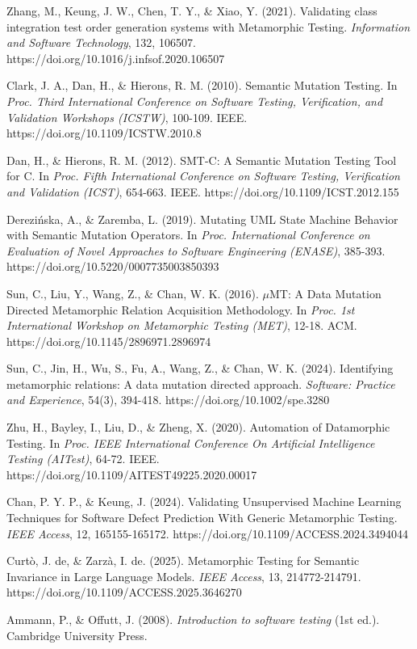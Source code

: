 \documentclass[review,12pt,authoryear]{elsarticle}
\begin{document}
Zhang, M., Keung, J. W., Chen, T. Y., \& Xiao, Y. (2021). Validating
class integration test order generation systems with Metamorphic
Testing. \emph{Information and Software Technology}, 132, 106507.
https://doi.org/10.1016/j.infsof.2020.106507

Clark, J. A., Dan, H., \& Hierons, R. M. (2010). Semantic Mutation
Testing. In \emph{Proc. Third International Conference on Software
Testing, Verification, and Validation Workshops (ICSTW)}, 100-109. IEEE.
https://doi.org/10.1109/ICSTW.2010.8

Dan, H., \& Hierons, R. M. (2012). SMT-C: A Semantic Mutation Testing
Tool for C. In \emph{Proc. Fifth International Conference on Software
Testing, Verification and Validation (ICST)}, 654-663. IEEE.
https://doi.org/10.1109/ICST.2012.155

Derezińska, A., \& Zaremba, L. (2019). Mutating UML State Machine
Behavior with Semantic Mutation Operators. In \emph{Proc. International
Conference on Evaluation of Novel Approaches to Software Engineering
(ENASE)}, 385-393. https://doi.org/10.5220/0007735003850393

Sun, C., Liu, Y., Wang, Z., \& Chan, W. K. (2016). $\mu$MT: A Data Mutation
Directed Metamorphic Relation Acquisition Methodology. In \emph{Proc.
1st International Workshop on Metamorphic Testing (MET)}, 12-18. ACM.
https://doi.org/10.1145/2896971.2896974

Sun, C., Jin, H., Wu, S., Fu, A., Wang, Z., \& Chan, W. K. (2024).
Identifying metamorphic relations: A data mutation directed approach.
\emph{Software: Practice and Experience}, 54(3), 394-418.
https://doi.org/10.1002/spe.3280

Zhu, H., Bayley, I., Liu, D., \& Zheng, X. (2020). Automation of
Datamorphic Testing. In \emph{Proc. IEEE International Conference On
Artificial Intelligence Testing (AITest)}, 64-72. IEEE.
https://doi.org/10.1109/AITEST49225.2020.00017

Chan, P. Y. P., \& Keung, J. (2024). Validating Unsupervised Machine
Learning Techniques for Software Defect Prediction With Generic
Metamorphic Testing. \emph{IEEE Access}, 12, 165155-165172.
https://doi.org/10.1109/ACCESS.2024.3494044

Curtò, J. de, \& Zarzà, I. de. (2025). Metamorphic Testing for Semantic
Invariance in Large Language Models. \emph{IEEE Access}, 13,
214772-214791. https://doi.org/10.1109/ACCESS.2025.3646270

Ammann, P., \& Offutt, J. (2008). \emph{Introduction to software
testing} (1st ed.). Cambridge University Press.
\end{document}
